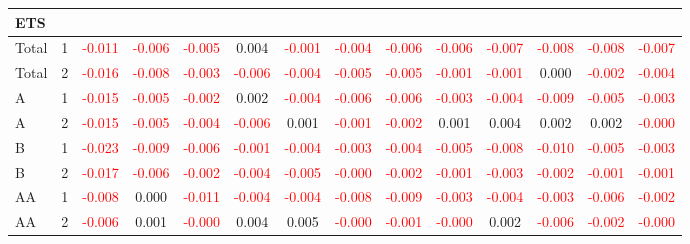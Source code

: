 \begin{table}[!htb]
{\begin{tabular}{llcccccccccccc}
\hline
ETS &  &  &  &  &  &  &  &  &  &  &  &  & \\
\hline
Total & 1 & \textcolor{red}{-0.011} & \textcolor{red}{-0.006} & \textcolor{red}{-0.005} & 0.004 & \textcolor{red}{-0.001} & \textcolor{red}{-0.004} & \textcolor{red}{-0.006} & \textcolor{red}{-0.006} & \textcolor{red}{-0.007} & \textcolor{red}{-0.008} & \textcolor{red}{-0.008} & \textcolor{red}{-0.007}\\
Total & 2 & \textcolor{red}{-0.016} & \textcolor{red}{-0.008} & \textcolor{red}{-0.003} & \textcolor{red}{-0.006} & \textcolor{red}{-0.004} & \textcolor{red}{-0.005} & \textcolor{red}{-0.005} & \textcolor{red}{-0.001} & \textcolor{red}{-0.001} & 0.000 & \textcolor{red}{-0.002} & \textcolor{red}{-0.004}\\
A & 1 & \textcolor{red}{-0.015} & \textcolor{red}{-0.005} & \textcolor{red}{-0.002} & 0.002 & \textcolor{red}{-0.004} & \textcolor{red}{-0.006} & \textcolor{red}{-0.006} & \textcolor{red}{-0.003} & \textcolor{red}{-0.004} & \textcolor{red}{-0.009} & \textcolor{red}{-0.005} & \textcolor{red}{-0.003}\\
A & 2 & \textcolor{red}{-0.015} & \textcolor{red}{-0.005} & \textcolor{red}{-0.004} & \textcolor{red}{-0.006} & 0.001 & \textcolor{red}{-0.001} & \textcolor{red}{-0.002} & 0.001 & 0.004 & 0.002 & 0.002 & \textcolor{red}{-0.000}\\
B & 1 & \textcolor{red}{-0.023} & \textcolor{red}{-0.009} & \textcolor{red}{-0.006} & \textcolor{red}{-0.001} & \textcolor{red}{-0.004} & \textcolor{red}{-0.003} & \textcolor{red}{-0.004} & \textcolor{red}{-0.005} & \textcolor{red}{-0.008} & \textcolor{red}{-0.010} & \textcolor{red}{-0.005} & \textcolor{red}{-0.003}\\
B & 2 & \textcolor{red}{-0.017} & \textcolor{red}{-0.006} & \textcolor{red}{-0.002} & \textcolor{red}{-0.004} & \textcolor{red}{-0.005} & \textcolor{red}{-0.000} & \textcolor{red}{-0.002} & \textcolor{red}{-0.001} & \textcolor{red}{-0.003} & \textcolor{red}{-0.002} & \textcolor{red}{-0.001} & \textcolor{red}{-0.001}\\
AA & 1 & \textcolor{red}{-0.008} & 0.000 & \textcolor{red}{-0.011} & \textcolor{red}{-0.004} & \textcolor{red}{-0.004} & \textcolor{red}{-0.008} & \textcolor{red}{-0.009} & \textcolor{red}{-0.003} & \textcolor{red}{-0.004} & \textcolor{red}{-0.003} & \textcolor{red}{-0.006} & \textcolor{red}{-0.002}\\
AA & 2 & \textcolor{red}{-0.006} & 0.001 & \textcolor{red}{-0.000} & 0.004 & 0.005 & \textcolor{red}{-0.000} & \textcolor{red}{-0.001} & \textcolor{red}{-0.000} & 0.002 & \textcolor{red}{-0.006} & \textcolor{red}{-0.002} & \textcolor{red}{-0.000}\\

\end{tabular}}
\end{table}
